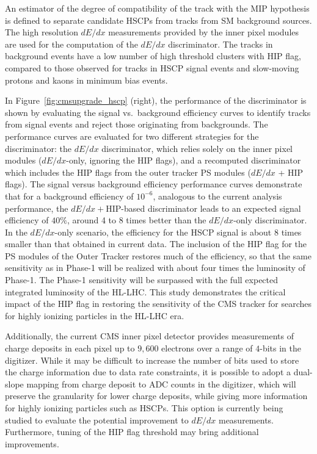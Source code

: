 An estimator of the degree of compatibility of the track with the MIP hypothesis is defined to separate candidate HSCPs from tracks from SM background sources. The high resolution $dE/dx$ measurements provided by the inner pixel modules are used for the computation of the $dE/dx$ discriminator. The tracks in background events have a low number of high threshold clusters with HIP flag, compared to those observed for tracks in HSCP signal events and slow-moving protons and kaons in minimum bias events.

In Figure~\ref{fig:cmsupgrade_hscp} (right), the performance of the discriminator is shown by evaluating the signal vs.~background efficiency curves to identify tracks from signal events and reject those originating from backgrounds. The performance curves are evaluated for two different strategies for the discriminator: the $dE/dx$ discriminator, which relies solely on the inner pixel modules ($dE/dx$-only, ignoring the HIP flags), and a recomputed discriminator which includes the HIP flags from the outer tracker PS modules ($dE/dx$ + HIP flags). The signal versus background efficiency performance curves demonstrate that for a background efficiency of $10^{-6}$, analogous to the current analysis performance, the $dE/dx+$HIP-based discriminator leads to an expected signal efficiency of $40\%$, around 4 to 8 times better than the $dE/dx$-only discriminator. In the $dE/dx$-only scenario, the efficiency for the HSCP signal is about 8 times smaller than that obtained in current data. The inclusion of the HIP flag for the PS modules of the Outer Tracker restores much of the efficiency, so that the same sensitivity as in Phase-1 will be realized with about four times the luminosity of Phase-1. The Phase-1 sensitivity will be surpassed with the full expected integrated luminosity of the HL-LHC. This study demonstrates the critical impact of the HIP flag in restoring the sensitivity of the CMS tracker for searches for highly ionizing particles in the HL-LHC era.

Additionally, the current CMS inner pixel detector provides measurements of charge deposits in each pixel up to $9,600$ electrons over a range of $4$-bits in the digitizer. While it may be difficult to increase the number of bits used to store the charge information due to data rate constraints, it is possible to adopt a dual-slope mapping from charge deposit to ADC counts in the digitizer, which will preserve the granularity for lower charge deposits, while giving more information for highly ionizing particles such as HSCPs. This option is currently being studied to evaluate the potential improvement to $dE/dx$ measurements. Furthermore, tuning of the HIP flag threshold may bring additional improvements.

